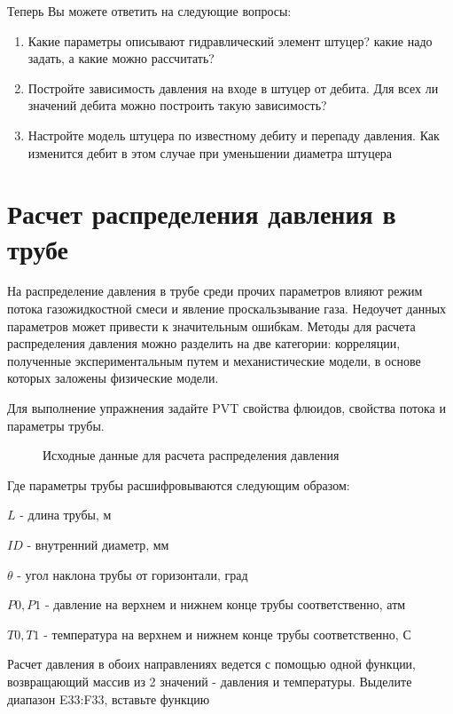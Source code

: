 Теперь Вы можете ответить на следующие вопросы:

\begin{enumerate}
	\item Какие параметры описывают гидравлический элемент штуцер? какие надо задать, а какие можно рассчитать?
	\item Постройте зависимость давления на входе в штуцер от дебита. Для всех ли значений дебита можно построить такую зависимость?
	\item Настройте модель штуцера по известному дебиту и перепаду давления. Как изменится дебит в этом случае при уменьшении диаметра штуцера
\end{enumerate}




\section{Расчет распределения давления в трубе}

На распределение давления в трубе среди прочих параметров влияют режим потока газожидкостной смеси и явление проскальзывание газа. Недоучет данных параметров может привести к значительным ошибкам. Методы для расчета распределения давления можно разделить на две категории: корреляции, полученные экспериментальным путем и механистические модели, в основе которых заложены физические модели.

Для выполнение упражнения задайте PVT свойства флюидов, свойства потока и параметры трубы.

\begin{figure}[h!]
	\center{\texttt{[image: Ex50\_1]}}
	\caption{Исходные данные для расчета распределения давления}
	\label{ris:Ex50_1}
\end{figure}

Где параметры трубы расшифровываются следующим образом:

$L$ - длина трубы, м

$ID$ - внутренний диаметр, мм

$\theta$ - угол наклона трубы от горизонтали, град

$P0, P1$ - давление на верхнем и нижнем конце трубы соответственно, атм

$T0, T1$  - температура на верхнем и нижнем конце трубы соответственно, С

Расчет давления в обоих направлениях ведется с помощью одной функции, возвращающий массив из 2 значений - давления и температуры. Выделите диапазон E33:F33, вставьте функцию

